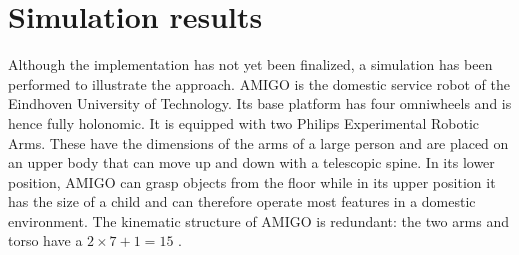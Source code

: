 
\section{Simulation results}\label{wbp:sec:simulations}
Although the implementation has not yet been finalized, a simulation has been performed to illustrate the approach.
AMIGO is the domestic service robot of the Eindhoven University of Technology. Its base platform has four omniwheels and is hence fully holonomic. It is equipped with two  Philips Experimental Robotic Arms. These have the dimensions of the arms of a large person and are placed on an upper body that can move up and down with a telescopic spine. In its lower position, AMIGO can grasp objects from the floor while in its upper position it has the size of a child and can therefore operate most features in a domestic environment. The kinematic structure of AMIGO is redundant: the two arms and torso have a $2 \times 7 +1 = 15$ \dofs.

